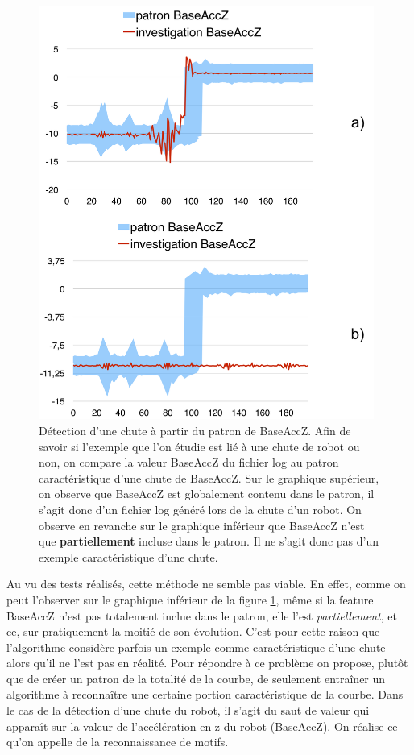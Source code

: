 \begin{figure}[h]
	\centering\includegraphics[width=11cm]{images/patron_comp.png}
	\caption[Détection d'une chute à partir du patron de BaseAccZ]{Détection d'une chute à partir du patron de BaseAccZ. Afin de savoir si l'exemple que l'on étudie est lié à une chute de robot ou non, on compare la valeur BaseAccZ du fichier log au patron caractéristique d'une chute de BaseAccZ. Sur le graphique supérieur, on observe que BaseAccZ est globalement contenu dans le patron, il s'agit donc d'un fichier log généré lors de la chute d'un robot. On observe en revanche sur le graphique inférieur que BaseAccZ n'est que \textbf{partiellement} incluse dans le patron. Il ne s'agit donc pas d'un exemple caractéristique d'une chute. }
	\label{fig:Détection d'une chute à partir du patron de BaseAccZ}
\end{figure}

Au vu des tests réalisés, cette méthode ne semble pas viable. En effet, comme on peut l'observer sur le graphique inférieur de la figure \ref{fig:Détection d'une chute à partir du patron de BaseAccZ}, même si la feature BaseAccZ n'est pas totalement inclue dans le patron, elle l'est \emph{partiellement}, et ce, sur pratiquement la moitié de son évolution. C'est pour cette raison que l'algorithme considère parfois un exemple comme caractéristique d'une chute alors qu'il ne l'est pas en réalité. Pour répondre à ce problème on propose, plutôt que de créer un patron de la totalité de la courbe, de seulement entraîner un algorithme à reconnaître une certaine portion caractéristique de la courbe. Dans le cas de la détection d'une chute du robot, il s'agit du saut de valeur qui apparaît sur la valeur de l'accélération en z du robot (BaseAccZ). On réalise ce qu'on appelle de la reconnaissance de motifs. 

